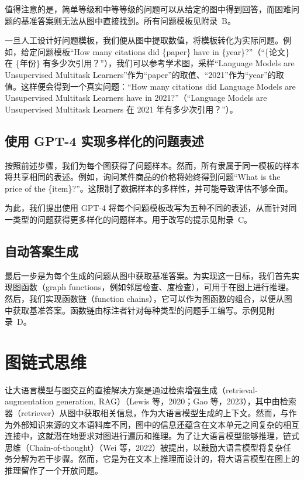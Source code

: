 \documentclass[11pt,UTF8,fontset=fandol]{ctexart}
\begin{document}
值得注意的是，简单等级和中等等级的问题可以从给定的图中得到回答，而困难问题的基准答案则无法从图中直接找到。所有问题模板见附录~B。

一旦人工设计好问题模板，我们便从图中提取数值，将模板转化为实际问题。例如，给定问题模板“How many citations did \{paper\} have in \{year\}?”（“\{论文\} 在 \{年份\} 有多少次引用？”），我们可以参考学术图，采样“Language Models are Unsupervised Multitask Learners”作为“paper”的取值、“2021”作为“year”的取值。这样便会得到一个真实问题：“How many citations did Language Models are Unsupervised Multitask Learners have in 2021?”（“Language Models are Unsupervised Multitask Learners 在 2021 年有多少次引用？”）。

\subsection{使用 GPT-4 实现多样化的问题表述}

按照前述步骤，我们为每个图获得了问题样本。然而，所有隶属于同一模板的样本将共享相同的表述。例如，询问某件商品的价格将始终得到问题“What is the price of the \{item\}?”。这限制了数据样本的多样性，并可能导致评估不够全面。

为此，我们提出使用 GPT-4 将每个问题模板改写为五种不同的表述，从而针对同一类型的问题获得更多样化的问题样本。用于改写的提示见附录~C。

\subsection{自动答案生成}

最后一步是为每个生成的问题从图中获取基准答案。为实现这一目标，我们首先实现图函数（graph functions，例如邻居检查、度检查），可用于在图上进行推理。然后，我们实现函数链（function chains），它可以作为图函数的组合，以便从图中获取基准答案。函数链由标注者针对每种类型的问题手工编写。示例见附录~D。

\section{图链式思维}

让大语言模型与图交互的直接解决方案是通过检索增强生成（retrieval-augmentation generation, RAG）（Lewis 等，2020；Gao 等，2023），其中由检索器（retriever）从图中获取相关信息，作为大语言模型生成的上下文。然而，与作为外部知识来源的文本语料库不同，图中的信息还蕴含在文本单元之间复杂的相互连接中，这就潜在地要求对图进行遍历和推理。为了让大语言模型能够推理，链式思维（Chain-of-thought）（Wei 等，2022）被提出，以鼓励大语言模型将复杂任务分解为若干步骤。然而，它是为在文本上推理而设计的，将大语言模型在图上的推理留作了一个开放问题。
\end{document}
